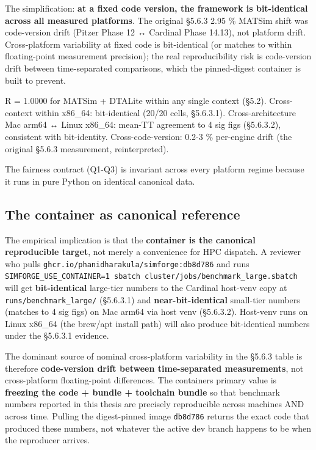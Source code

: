 The simplification: \textbf{at a fixed code version, the framework is
bit-identical across all measured platforms}. The original §5.6.3 2.95
\% MATSim shift was code-version drift (Pitzer Phase 12 ↔ Cardinal Phase
14.13), not platform drift. Cross-platform variability at fixed code is
bit-identical (or matches to within floating-point measurement
precision); the real reproducibility risk is code-version drift between
time-separated comparisons, which the pinned-digest container is built
to prevent.

R = 1.0000 for MATSim + DTALite within any single context (§5.2).
Cross-context within x86\_64: bit-identical (20/20 cells, §5.6.3.1).
Cross-architecture Mac arm64 ↔ Linux x86\_64: mean-TT agreement to 4 sig
figs (§5.6.3.2), consistent with bit-identity. Cross-code-version: 0.2-3
\% per-engine drift (the original §5.6.3 measurement, reinterpreted).

The fairness contract (Q1-Q3) is invariant across every platform regime
because it runs in pure Python on identical canonical data.

\subsection{The container as canonical
reference}\label{the-container-as-canonical-reference}

The empirical implication is that the \textbf{container is the canonical
reproducible target}, not merely a convenience for HPC dispatch. A
reviewer who pulls \texttt{ghcr.io/phanidharakula/simforge:db8d786} and
runs
\texttt{SIMFORGE\_USE\_CONTAINER=1\ sbatch\ cluster/jobs/benchmark\_large.sbatch}
will get \textbf{bit-identical} large-tier numbers to the Cardinal
host-venv copy at \texttt{runs/benchmark\_large/} (§5.6.3.1) and
\textbf{near-bit-identical} small-tier numbers (matches to 4 sig figs)
on Mac arm64 via host venv (§5.6.3.2). Host-venv runs on Linux x86\_64
(the brew/apt install path) will also produce bit-identical numbers
under the §5.6.3.1 evidence.

The dominant source of nominal cross-platform variability in the §5.6.3
table is therefore \textbf{code-version drift between time-separated
measurements}, not cross-platform floating-point differences. The
container\textquotesingle s primary value is \textbf{freezing the code +
bundle + toolchain bundle} so that benchmark numbers reported in this
thesis are precisely reproducible across machines AND across time.
Pulling the digest-pinned image \texttt{db8d786} returns the exact code
that produced these numbers, not whatever the active dev branch happens
to be when the reproducer arrives.

